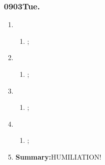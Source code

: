\subsubsection{0903Tue.}
\begin{enumerate}
	\item \ncquaone
	\begin{enumerate}[(1)]
		\item ;\rightundoneBlack
	\end{enumerate}
	
	\item \ncquatwo	
	\begin{enumerate}[(1)]
		\item ;\rightundoneBlack
	\end{enumerate}
	
	\item \ncquathree
	\begin{enumerate}[(1)]
		\item ;\rightundoneBlack
	\end{enumerate}
	
	\item \ncquafour	
	\begin{enumerate}[(1)]
		\item ;\rightundoneBlack
	\end{enumerate}
	\item \textbf{Summary:}HUMILIATION! 
\end{enumerate}
